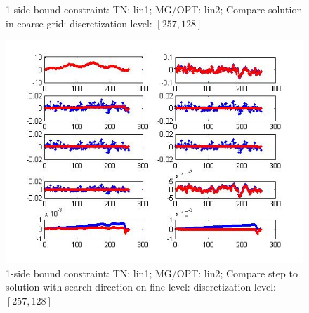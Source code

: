 \documentclass[10pt]{article}
\begin{document}
\begin{figure}[H]
  \centering
  \caption{1-side bound constraint: TN: lin1; MG/OPT: lin2; Compare solution in coarse grid: discretization level: $[257,128]$}
  \label{fig:coarse1s12}
\end{figure}

\begin{figure}
  \centering
  \includegraphics[width=1\textwidth]{finedir1s12}
  \caption{1-side bound constraint: TN: lin1; MG/OPT: lin2;  Compare step to solution with search direction on fine level: discretization level: $[257,128]$}
  \label{fig:fine1s12}
\end{figure}
\end{document}
